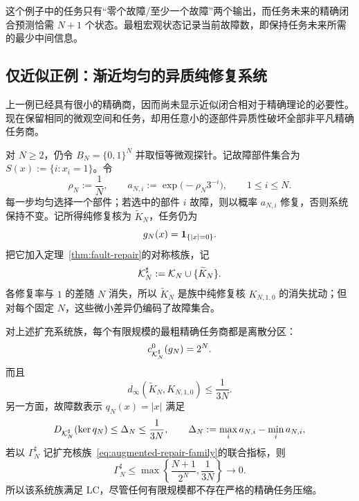 这个例子中的任务只有“零个故障/至少一个故障”两个输出，而任务未来的精确闭合预测恰需 $N+1$ 个状态。最粗宏观状态记录当前故障数，即保持任务未来所需的最少中间信息。

\subsection{仅近似正例：渐近均匀的异质纯修复系统}

上一例已经具有很小的精确商，因而尚未显示近似闭合相对于精确理论的必要性。现在保留相同的微观空间和任务，却用任意小的逐部件异质性破坏全部非平凡精确任务商。

对 $N\ge2$，仍令 $B_N=\{0,1\}^N$ 并取恒等微观探针。记故障部件集合为
$S(x):=\{i:x_i=1\}$。令
\begin{equation}
 \rho_N:=\frac1N,
 \qquad
 a_{N,i}:=\exp\!\bigl(-\rho_N3^{-i}\bigr),
 \qquad 1\le i\le N.
 \label{eq:heterogeneous-repair-rates}
\end{equation}
每一步均匀选择一个部件；若选中的部件 $i$ 故障，则以概率 $a_{N,i}$ 修复，否则系统保持不变。记所得纯修复核为 $\widetilde K_N$，任务仍为
\[
 g_N(x)=\mathbf 1_{\{|x|=0\}}.
\]
把它加入定理~\ref{thm:fault-repair}的对称核族，记
\begin{equation}
 \mathcal K_N^\sharp:=\mathcal K_N\cup\{\widetilde K_N\}.
 \label{eq:augmented-repair-family}
\end{equation}
各修复率与 $1$ 的差随 $N$ 消失，所以 $\widetilde K_N$ 是族中纯修复核 $K_{N,1,0}$ 的消失扰动；但对每个固定 $N$，这些微小差异仍编码了故障集合。

\begin{theorem}[只有近似压缩的异质纯修复族]
\label{thm:heterogeneous-repair}
对上述扩充系统族，每个有限规模的最粗精确任务商都是离散分区：
\begin{equation}
 c^0_{\mathcal K_N^\sharp}(g_N)=2^N.
 \label{eq:heterogeneous-exact-complexity}
\end{equation}
而且
\begin{equation}
 d_\infty(\widetilde K_N,K_{N,1,0})\le\frac1{3N}.
 \label{eq:heterogeneous-kernel-perturbation}
\end{equation}
另一方面，故障数表示 $q_N(x)=|x|$ 满足
\begin{equation}
 D_{\mathcal K_N^\sharp}(\ker q_N)
 \le \Delta_N
 \le \frac1{3N},
 \qquad
 \Delta_N:=\max_i a_{N,i}-\min_i a_{N,i},
 \label{eq:heterogeneous-diameter-bound}
\end{equation}
若以 $\Gamma_N^\sharp$ 记扩充核族~\eqref{eq:augmented-repair-family}的联合指标，则
\begin{equation}
 \Gamma_N^\sharp
 \le
 \max\left\{\frac{N+1}{2^N},\frac1{3N}\right\}
 \longrightarrow0.
 \label{eq:heterogeneous-gamma-bound}
\end{equation}
所以该系统族满足 LC，尽管任何有限规模都不存在严格的精确任务压缩。
\end{theorem}

